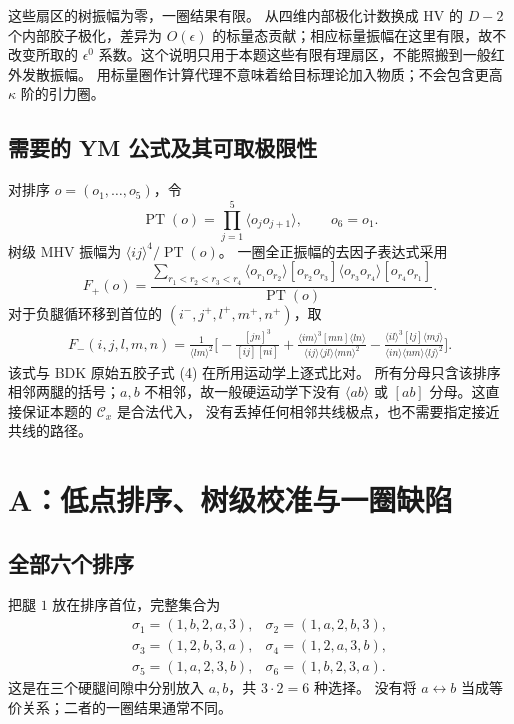 \documentclass[UTF8,a4paper,11pt,fontset=fandol]{ctexart}
\newcommand{\ang}[1]{\langle #1\rangle}
\newcommand{\sq}[1]{[#1]}
\newcommand{\Cx}{\mathcal C_x}
\newcommand{\PT}{\operatorname{PT}}
\begin{document}
这些扇区的树振幅为零，一圈结果有限。
从四维内部极化计数换成 HV 的 $D-2$ 个内部胶子极化，差异为
$O(\epsilon)$ 的标量态贡献；相应标量振幅在这里有限，故不改变所取的
$\epsilon^0$ 系数。这个说明只用于本题这些有限有理扇区，不能照搬到一般红外发散振幅。
用标量圈作计算代理不意味着给目标理论加入物质；不会包含更高 $\kappa$ 阶的引力圈。

\subsection{需要的 YM 公式及其可取极限性}
对排序 $o=(o_1,\ldots,o_5)$，令
\begin{equation}
 \PT(o)=\prod_{j=1}^5\ang{o_j o_{j+1}},\qquad o_6=o_1.
\end{equation}
树级 MHV 振幅为 $\ang{ij}^4/\PT(o)$。
一圈全正振幅的去因子表达式采用\cite{NPT}
\begin{equation}
 F_+(o)=\frac{\displaystyle\sum_{r_1<r_2<r_3<r_4}
 \ang{o_{r_1}o_{r_2}}\sq{o_{r_2}o_{r_3}}
 \ang{o_{r_3}o_{r_4}}\sq{o_{r_4}o_{r_1}}}{\PT(o)}.
\label{eq:plusformula}
\end{equation}
对于负腿循环移到首位的 $(i^-,j^+,l^+,m^+,n^+)$，取\cite{BDKsoft}
\begin{align}
 F_-(i,j,l,m,n)=\frac1{\ang{lm}^2}\bigg[
 -\frac{\sq{jn}^3}{\sq{ij}\sq{ni}}
 +\frac{\ang{im}^3\sq{mn}\ang{ln}}{\ang{ij}\ang{jl}\ang{mn}^2}
 -\frac{\ang{il}^3\sq{lj}\ang{mj}}{\ang{in}\ang{nm}\ang{lj}^2}
 \bigg].\label{eq:minusformula}
\end{align}
该式与 BDK 原始五胶子式 (4)\cite{BDK93} 在所用运动学上逐式比对。
所有分母只含该排序相邻两腿的括号；$a,b$ 不相邻，故一般硬运动学下没有
$\ang{ab}$ 或 $\sq{ab}$ 分母。这直接保证本题的 $\Cx$ 是合法代入，
没有丢掉任何相邻共线极点，也不需要指定接近共线的路径。

\section{A：低点排序、树级校准与一圈缺陷}

\subsection{全部六个排序}
把腿 $1$ 放在排序首位，完整集合为
\begin{equation}
\begin{array}{lll}
 \sigma_1=(1,b,2,a,3),&\sigma_2=(1,a,2,b,3),\\
 \sigma_3=(1,2,b,3,a),&\sigma_4=(1,2,a,3,b),\\
 \sigma_5=(1,a,2,3,b),&\sigma_6=(1,b,2,3,a).
\end{array}\label{eq:orders}
\end{equation}
这是在三个硬腿间隙中分别放入 $a,b$，共 $3\cdot2=6$ 种选择。
没有将 $a\leftrightarrow b$ 当成等价关系；二者的一圈结果通常不同。
\end{document}
